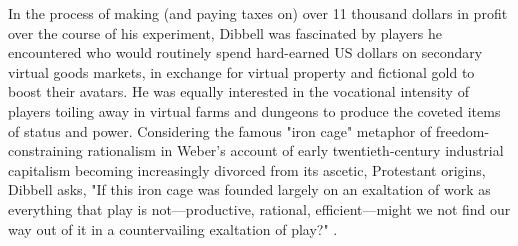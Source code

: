 In the process of making (and paying taxes on) over 11 thousand dollars in profit over the course of his experiment, Dibbell was fascinated by players he encountered who would routinely spend hard-earned US dollars on secondary virtual goods markets, in exchange for virtual property and fictional gold to boost their avatars. He was equally interested in the vocational intensity of players toiling away in virtual farms and dungeons to produce the coveted items of status and power. Considering the famous "iron cage" metaphor of freedom-constraining rationalism in Weber's account of early twentieth-century industrial capitalism becoming increasingly divorced from its ascetic, Protestant origins, Dibbell asks, "If this iron cage was founded largely on an exaltation of work as everything that play is not---productive, rational, efficient---might we not find our way out of it in a countervailing exaltation of play?" \autocite[62]{Dibbell2007-dd}.

